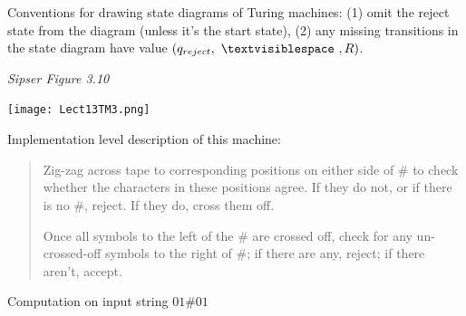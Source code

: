 \documentclass[12pt, oneside]{article}
\begin{document}
Conventions for drawing state diagrams of Turing machines: (1) omit the reject state from the diagram (unless 
it's the  start state), (2) any missing transitions in the state diagram have value $(q_{reject}, ~\textvisiblespace~ , R)$.
\newpage

{\it Sipser Figure  3.10}
\begin{multicols}{2}
\vspace{-20pt}
\begin{center}
\texttt{[image: Lect13TM3.png]}
\end{center}

Implementation level description of this machine:
\begin{quote}
Zig-zag across tape to corresponding positions on either side of $\#$ to check whether the 
characters in these positions agree. If they do not, or if there is no $\#$, reject. If they 
do, cross them off.

Once all symbols to the left of the $\#$ are crossed off, check for any un-crossed-off symbols 
to the right of $\#$; if there are any, reject; if there aren't, accept.
\end{quote}

\columnbreak

Computation on  input  string  $01\#01$


\end{multicols}
\end{document}
